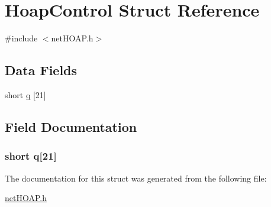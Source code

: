 \hypertarget{struct_hoap_control}{\section{Hoap\-Control Struct Reference}
\label{struct_hoap_control}
}


{\ttfamily \#include $<$net\-H\-O\-A\-P.\-h$>$}

\subsection*{Data Fields}
\begin{DoxyCompactItemize}
\item 
short \hyperlink{struct_hoap_control_af901d9eeb7e1a1c873559735d52cf4ac}{q} \mbox{[}21\mbox{]}
\end{DoxyCompactItemize}


\subsection{Field Documentation}
\hypertarget{struct_hoap_control_af901d9eeb7e1a1c873559735d52cf4ac}{
\subsubsection[{q}]{\setlength{\rightskip}{0pt plus 5cm}short q\mbox{[}21\mbox{]}}}\label{struct_hoap_control_af901d9eeb7e1a1c873559735d52cf4ac}


The documentation for this struct was generated from the following file\-:\begin{DoxyCompactItemize}
\item 
\hyperlink{net_h_o_a_p_8h}{net\-H\-O\-A\-P.\-h}\end{DoxyCompactItemize}
